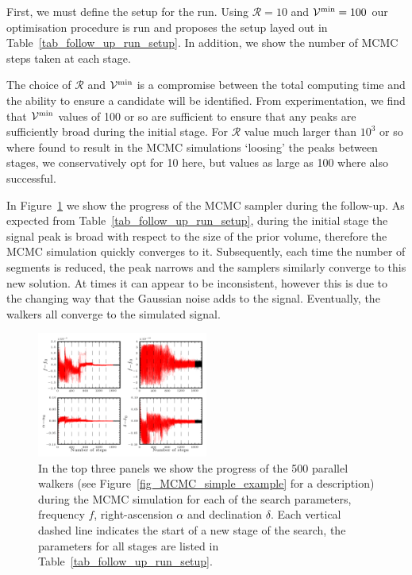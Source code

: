 \documentclass[aps, prd, twocolumn, superscriptaddress, floatfix, showpacs, nofootinbib, longbibliography]{revtex4-1}
\begin{document}
First, we must define the setup for the run. Using $\mathcal{R}=10$ and
$\mathcal{V}^{\rm min}=100$ our optimisation procedure is run and proposes the setup
layed out in Table~\ref{tab_follow_up_run_setup}. In addition, we show the
number of MCMC steps taken at each stage.
\begin{table}[htb]
\caption{The search setup used in Figure~\ref{fig_follow_up}, generated with
$\mathcal{R}=10$ and $\Nseg^0=100$.}
\label{tab_follow_up_run_setup}

\end{table}

The choice of $\mathcal{R}$ and $\mathcal{V}^{\rm min}$ is a compromise between the
total computing time and the ability to ensure a candidate will be identified.
From experimentation, we find that $\mathcal{V}^{\rm min}$ values of 100 or so are
sufficient to ensure that any peaks are sufficiently broad during the
initial stage. For $\mathcal{R}$ value much larger than $10^{3}$ or so where
found to result in the MCMC simulations `loosing' the peaks between stages, we
conservatively opt for 10 here, but values as large as 100 where also successful.

In Figure~\ref{fig_follow_up} we show the progress of the MCMC sampler during
the follow-up.  As expected from Table~\ref{tab_follow_up_run_setup}, during
the initial stage the signal peak is broad with respect to the size of the
prior volume, therefore the MCMC simulation quickly converges to it. Subsequently,
each time the number of segments is reduced, the peak narrows and the samplers
similarly converge to this new solution. At times it can appear to be inconsistent,
however this is due to the changing way that the Gaussian noise adds to the signal.
Eventually, the walkers all converge to the simulated signal.
\begin{figure}[htb]
\centering
\includegraphics[width=0.5\textwidth]{follow_up_walkers}
\caption{In the top three panels we show the progress of the 500 parallel
walkers (see Figure~\ref{fig_MCMC_simple_example} for a description) during the
MCMC simulation for each of the search parameters, frequency $f$,
right-ascension $\alpha$ and declination $\delta$. Each vertical dashed line indicates the start of a new stage of the search, the parameters for all stages
are listed in Table~\ref{tab_follow_up_run_setup}.}
\label{fig_follow_up}
\end{figure}
\end{document}
